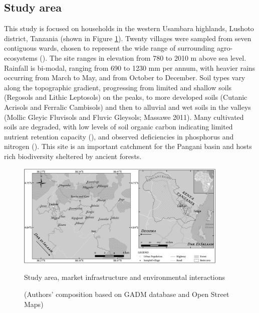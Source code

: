 \subsection{Study area}

This study is focused on households in the western Usambara highlands, Lushoto district, Tanzania (shown in Figure \ref{map:04_1}). Twenty villages were sampled from seven contiguous wards, chosen to represent the wide range of surrounding agro-ecosystems (\citealp{Rufino2013}). The site ranges in elevation from 780 to 2010 m above sea level. Rainfall is bi-modal, ranging from 690 to 1230 mm per annum, with heavier rains occurring from March to May, and from October to December. Soil types vary along the topographic gradient, progressing from limited and shallow soils (Regosols and Lithic Leptosols) on the peaks, to more developed soils (Cutanic Acrisols and Ferralic Cambisols) and then to alluvial and wet soils in the valleys (Mollic Gleyic Fluvisols and Fluvic Gleysols; Massawe 2011). Many cultivated soils are degraded, with low levels of soil organic carbon indicating limited nutrient retention capacity (\citealp{Winowiecki2016263}), and observed deficiencies in phosphorus and nitrogen (\citealp{Ndakidemi2006}). This site is an important catchment for the Pangani basin and hosts rich biodiversity sheltered by ancient forests.

\begin{figure}
  \includegraphics[width=0.9\textwidth]{figs_04/image1.png}
  \captionsetup{singlelinecheck = false, justification=justified} %
  \caption{Study area, market infrastructure and environmental interactions}
  \label{map:04_1}
  \vspace*{-3mm}
  \caption*{(Authors' composition based on GADM database and Open Street Maps)}
\end{figure}




